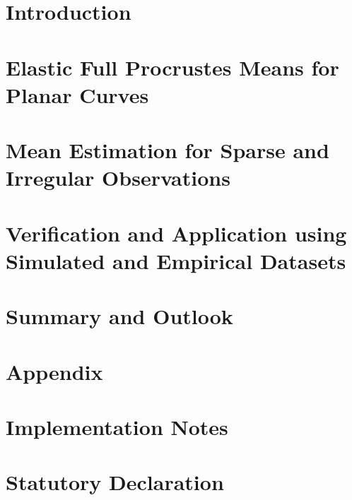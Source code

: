 \documentclass[a4paper,12pt,english,headings=small]{scrreprt}
\theoremstyle{plain}
\theoremstyle{definition}
\theoremstyle{remark}
\theoremstyle{plain}
\begin{document}
\listoftodos



\newpage
{}
\chapter{Introduction}


\newpage
\chapter{Elastic Full Procrustes Means for Planar Curves}


\newpage
\chapter{Mean Estimation for Sparse and Irregular Observations}


\newpage
\chapter{Verification and Application using Simulated and Empirical Datasets}


\newpage
\chapter{Summary and Outlook}




\newpage
\nocite{*}
\printbibliography[heading=bibintoc] %




\newpage
\appendix
\chapter{Appendix}


\newpage
\chapter{Implementation Notes}


\newpage
\chapter*{Statutory Declaration}


%

\end{document}
